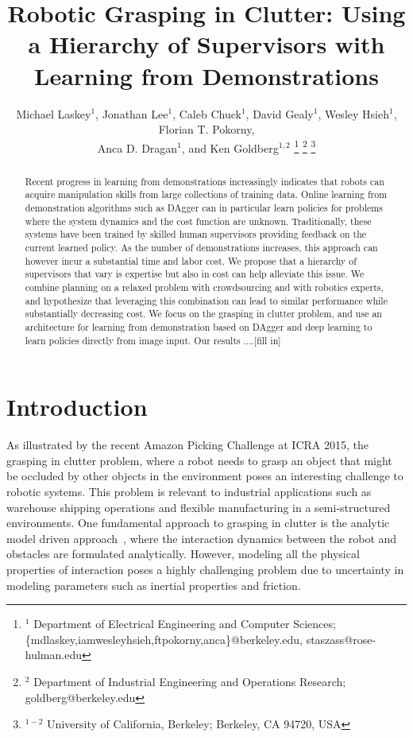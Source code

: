 \documentclass[10pt, conference]{ieeeconf}      %
\title{Robotic Grasping in Clutter: Using a Hierarchy of Supervisors with Learning from Demonstrations}
\author{Michael Laskey$^1$, Jonathan Lee$^1$, Caleb Chuck$^1$, David Gealy$^1$, Wesley Hsieh$^1$, Florian T. Pokorny,\\
 Anca D. Dragan$^1$, and Ken Goldberg$^{1,2}$%
\thanks{$^1$ Department of Electrical Engineering and Computer Sciences; {\small \{mdlaskey,iamwesleyhsieh,ftpokorny,anca\}@berkeley.edu, \small staszass@rose-hulman.edu} }%
\thanks{$^2$ Department of Industrial Engineering and Operations Research; {\small goldberg@berkeley.edu}}%
\thanks{$^{1-2}$ University of California, Berkeley;  Berkeley, CA 94720, USA}%
}
\begin{document}
\maketitle
\thispagestyle{empty}
\pagestyle{empty}



\begin{abstract}
Recent progress in learning from demonstrations increasingly indicates that robots can acquire manipulation skills from
large collections of training data. Online learning from demonstration algorithms such as DAgger can in particular learn
policies for problems where the system dynamics and the cost function are unknown. Traditionally, these systems have
been trained by skilled human supervisors providing feedback on the current learned policy. As the number of
demonstrations increases, this approach can however incur a substantial time and labor cost. We propose that a hierarchy of supervisors that vary is expertise but also in cost can help alleviate this issue. We combine planning on a relaxed problem with crowdsourcing and with robotics experts, and hypothesize that leveraging this combination can lead to similar performance while substantially decreasing cost. We focus on the grasping in clutter problem, and use an architecture for learning from demonstration based on DAgger and deep learning to learn policies directly from image input. Our results ....[fill in]

 \end{abstract}



\section{Introduction} 
As illustrated by the recent Amazon Picking Challenge at ICRA 2015, the grasping in clutter problem, where a robot needs
to grasp an object that might be occluded by other objects in the environment poses an interesting challenge to robotic
systems. This problem is relevant to industrial applications such as warehouse shipping operations and flexible manufacturing in a semi-structured environments. One fundamental approach to grasping in clutter is the analytic model driven approach~\cite{bicchi2000robotic},
where the interaction dynamics between the robot and obstacles are formulated analytically. However, modeling all the 
physical properties of interaction poses a highly challenging problem due to uncertainty in modeling parameters such as
inertial properties and friction. 
\end{document}
